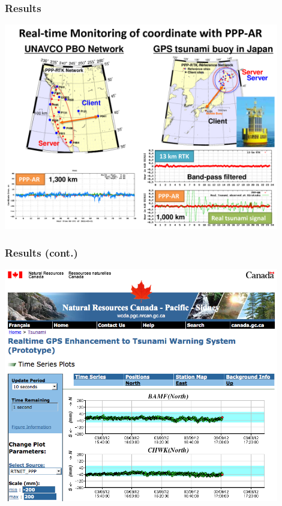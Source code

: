 \documentclass[10pt]{beamer}
\begin{document}

\begin{frame}
  \frametitle{Results}
  \begin{center}
    \includegraphics[width=0.9\textwidth]{tsunami.pdf}
  \end{center}
\end{frame}


\begin{frame}
  \frametitle{Results (cont.)}
  \begin{center}
    \includegraphics[width=0.9\textwidth]{nrcan.png}
  \end{center}
\end{frame}
\end{document}
